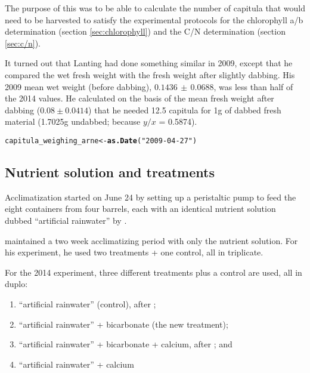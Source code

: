 \documentclass[12pt,a4paper,draft]{article}\usepackage[]{graphicx}\usepackage[]{color}
\makeatletter
\newcommand{\hlstr}[1]{\textcolor[rgb]{0.192,0.494,0.8}{#1}}%
\newcommand{\hlstd}[1]{\textcolor[rgb]{0.345,0.345,0.345}{#1}}%
\newcommand{\hlkwb}[1]{\textcolor[rgb]{0.69,0.353,0.396}{#1}}%
\newcommand{\hlkwd}[1]{\textcolor[rgb]{0.737,0.353,0.396}{\textbf{#1}}}%
\newenvironment{kframe}{%
 \def\at@end@of@kframe{}%
 \ifinner\ifhmode%
  \def\at@end@of@kframe{\end{minipage}}%
  \begin{minipage}{\columnwidth}%
 \fi\fi%
 \def\FrameCommand##1{\hskip\@totalleftmargin \hskip-\fboxsep
 \colorbox{shadecolor}{##1}\hskip-\fboxsep
     \hskip-\linewidth \hskip-\@totalleftmargin \hskip\columnwidth}%
 \MakeFramed {\advance\hsize-\width
   \@totalleftmargin\z@ \linewidth\hsize
   \@setminipage}}%
 {\par\unskip\endMakeFramed%
 \at@end@of@kframe}
\newenvironment{knitrout}{}{} %
\makeatother
\begin{document}
The purpose of this was to be able to calculate the number of capitula that would need to be harvested to satisfy the experimental protocols for the chlorophyll a/b determination (section \ref{sec:chlorophyll}) and the C/N determination (section \ref{sec:c/n}).  

It turned out that Lanting had done something similar in 2009, except that he compared the wet fresh weight with the fresh weight after slightly dabbing. His 2009 mean wet weight (before dabbing), $0.1436 \,\pm\, 0.0688$,
was less than half of the 2014 values.
He calculated on the basis of the mean fresh weight after dabbing ($0.08 \pm 0.0414$)
that he needed 12.5 capitula for 1g of dabbed fresh material (1.7025g undabbed; because $y/x$ = 0.5874).

\begin{knitrout}
\color{fgcolor}\begin{kframe}
\begin{alltt}
\hlstd{capitula_weighing_arne} \hlkwb{<-} \hlkwd{as.Date}\hlstd{(}\hlstr{"2009-04-27"}\hlstd{)}
\end{alltt}
\end{kframe}
\end{knitrout}

\subsection{Nutrient solution and treatments}
\label{sec:nutrients}

Acclimatization started on June 24 by setting up a peristaltic pump to feed the eight containers from four barrels, each with an identical nutrient solution dubbed ``artificial rainwater'' by \citet{smolders2001}.

\citet{lanting2010} maintained a two week acclimatizing period with only the nutrient solution. For his experiment, he used two treatments + one control, all in triplicate.

For the 2014 experiment, three different treatments plus a control are used, all in duplo:

\begin{enumerate}
\item ``artificial rainwater'' (control), after \citet{smolders2001};
\item ``artificial rainwater'' + bicarbonate (the new treatment);
\item ``artificial rainwater'' + bicarbonate + calcium, after \citet{lamers1999}; and
\item ``artificial rainwater'' + calcium
\end{enumerate}
\end{document}
